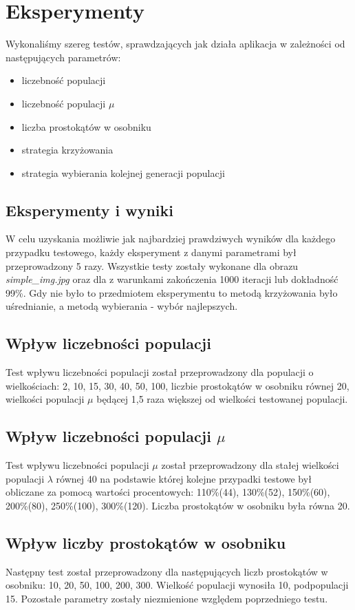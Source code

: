 \section{Eksperymenty}
Wykonaliśmy szereg testów, sprawdzających jak działa aplikacja w zależności od następujących parametrów:
\begin{itemize}
    \item liczebność populacji
    \item liczebność populacji $\mu$
    \item liczba prostokątów w osobniku
    \item strategia krzyżowania
    \item strategia wybierania kolejnej generacji populacji
\end{itemize}
\subsection{Eksperymenty i wyniki}
W celu uzyskania możliwie jak najbardziej prawdziwych wyników dla każdego przypadku testowego, każdy eksperyment z danymi parametrami był przeprowadzony 5 razy. Wszystkie testy zostały wykonane dla obrazu {\it simple\_img.jpg} oraz dla z warunkami zakończenia 1000 iteracji lub dokładność 99\%. Gdy nie było to przedmiotem eksperymentu to metodą krzyżowania było uśrednianie, a metodą wybierania - wybór najlepszych.
\subsection*{Wpływ liczebności populacji}
Test wpływu liczebności populacji został przeprowadzony dla populacji o wielkościach: 2, 10, 15, 30, 40, 50, 100, liczbie prostokątów w osobniku równej 20, wielkości populacji $\mu$ będącej 1,5 raza większej od wielkości testowanej populacji.
\subsection*{Wpływ liczebności populacji $\mu$}
Test wpływu liczebności populacji $\mu$ został przeprowadzony dla stałej wielkości populacji $\lambda$ równej 40 na podstawie której kolejne przypadki testowe był obliczane za pomocą wartości procentowych: 110\%(44), 130\%(52),
150\%(60), 200\%(80), 250\%(100), 300\%(120). Liczba prostokątów w osobniku była równa 20.
\subsection*{Wpływ liczby prostokątów w osobniku}
Następny test został przeprowadzony dla następujących liczb prostokątów w osobniku: 10, 20, 50, 100, 200, 300. Wielkość populacji wynosiła 10, podpopulacji 15. Pozostałe parametry zostały niezmienione względem poprzedniego testu. 
